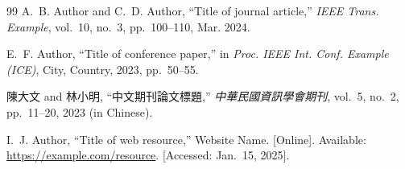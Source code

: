 \documentclass[10pt, a4paper, twocolumn]{article}
\begin{document}
\balance
\begingroup
\raggedright
\small
\begin{thebibliography}{99}
A.~B. Author and C.~D. Author, ``Title of journal article,''
\textit{IEEE Trans. Example}, vol.~10, no.~3, pp.~100--110, Mar. 2024.

E.~F. Author, ``Title of conference paper,'' in
\textit{Proc. IEEE Int. Conf. Example (ICE)}, City, Country, 2023, pp.~50--55.

陳大文 and 林小明, ``中文期刊論文標題,'' \textit{中華民國資訊學會期刊},
vol.~5, no.~2, pp.~11--20, 2023 (in Chinese).

I.~J. Author, ``Title of web resource,'' Website Name. [Online]. Available:
\url{https://example.com/resource}. [Accessed: Jan.~15, 2025].
\end{thebibliography}
\endgroup
\end{document}
